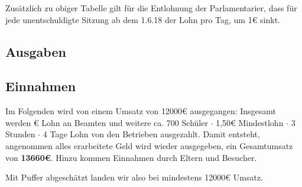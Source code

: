 \documentclass{sasbase}
\begin{document}
\vspace{5mm}

Zusätzlich zu obiger Tabelle gilt für die Entlohnung der Parlamentarier, dass für jede
unentschuldigte Sitzung ab dem 1.6.18 der Lohn pro Tag, um 1€ sinkt.

\subsection{Ausgaben}

\begin{kostenrechnung}
\end{kostenrechnung}

\newpage

\subsection{Einnahmen}

\noindent Im Folgenden wird von einem Umsatz von 12000€ ausgegangen: Insgesamt werden \thebeamten € Lohn
an Beamten und weitere ca. 700 Schüler $\cdot$ 1,50€ Mindestlohn $\cdot$ 3 Stunden
$\cdot$ 4 Tage Lohn von den Betrieben ausgezahlt.
Damit entsteht, angenommen alles erarbeitete Geld wird wieder ausgegeben, ein Gesamtumsatz von
\textbf{13660€}. Hinzu kommen Einnahmen durch Eltern und Besucher.

\noindent Mit Puffer abgeschätzt landen wir also bei mindestens 12000€ Umsatz.

\vspace{5mm}
\begin{kostenrechnung}
\end{kostenrechnung}
\end{document}
